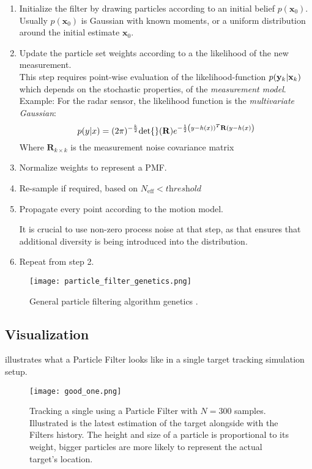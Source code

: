 \begin{enumerate}
	\item Initialize the filter by drawing particles according to an initial belief $p(\mathbf{x}_0)$.\\
	
	Usually  $p(\mathbf{x}_0)$ is Gaussian with known moments, or a uniform distribution around the initial estimate  $\mathbf{x}_{0}$.
	
	\item Update the particle set weights according to a the likelihood of the new measurement.\\
	
	This step requires point-wise evaluation of the likelihood-function $p(\mathbf{{{y}}}_k | \mathbf{x}_k)$ which depends on the stochastic properties, of the \emph{measurement model}.\\
	
	Example: For the radar sensor, the likelihood function is the \emph{multivariate Gaussian}:
	$$
	p({{y}}|x) = (2\pi)^{-\frac{k}{2}}{\text{det}\{{}\}}(\mathbf{R})e^{-\frac{1}{2}\left({{y}}-h(x))^{T}\mathbf{R}({{y}}-h(x)\right)}
	$$
	Where $\mathbf{R}_{k\times k}$ is the measurement noise covariance matrix
	
	
	\item Normalize weights to represent a PMF.
	\item Re-sample if required, based on $N_{\text{eff}} < \textit{threshold}$
	\item Propagate every point according to the motion model.
	
	It is crucial to use non-zero process noise at that step, as that ensures that additional diversity is being introduced into the distribution.
	
	\item Repeat from step 2.
\end{enumerate}



\begin{figure}[H]
	\centering
	\texttt{[image: particle\_filter\_genetics.png]}
	\caption{General particle filtering algorithm genetics \cite{Chatzi2002}.}
	\label{fig:PF_genetics}
\end{figure}
\subsection{Visualization}
 illustrates what a Particle Filter looks like in a single target tracking simulation setup.
\begin{figure}[H]
	\centering
	\texttt{[image: good\_one.png]}
	\caption{Tracking a single using a Particle Filter with $N=300$ samples.  Illustrated is the latest estimation of the target alongside with the Filters history. The height and size of a particle is proportional to its weight, \ie bigger particles are more likely to represent the actual target's location.}
	\label{fig:PFsim}
\end{figure}

